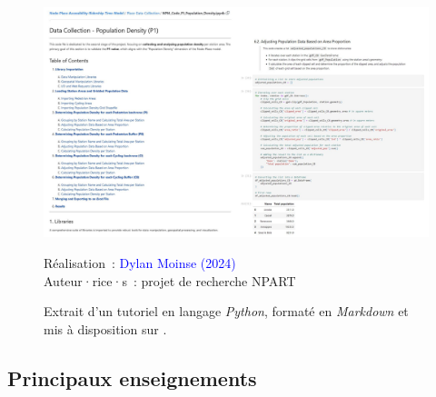 \begin{refsegment}
    \begin{figure}[h!]\vspace*{4pt}
        \caption{Extrait d'un tutoriel en langage \textsl{Python}, formaté en \textsl{Markdown} et mis à disposition sur .}
        \label{fig-chap6:screen-github-2}
        \centerline{\includegraphics[width=1\columnwidth]{src/Figures/Chap-6/FR_EN_NPART_Screen_Github_2.jpeg}}
        \vspace{5pt}
        \begin{flushright}\scriptsize{
        Réalisation~: \textcolor{blue}{Dylan Moinse (2024)}
        \\
        Auteur·rice·s~: projet de recherche \acrshort{NPART}
        }\end{flushright}
    \end{figure}

\subsection*{Principaux enseignements
    \label{chap6:principaux-enseignements}
    }


\end{refsegment}
